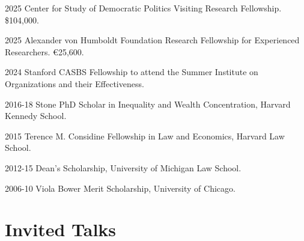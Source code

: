 \documentclass[12pt,letterpaper]{report}
\begin{document}
    \begin{tablist}
    \item[2025] \tab{}Center for Study of Democratic Politics Visiting Research Fellowship.  \$104,000.
    \item[2025] \tab{}Alexander von Humboldt Foundation Research Fellowship for Experienced Researchers. €25,600.
        \item[2024] \tab{}Stanford CASBS Fellowship to attend the Summer Institute on Organizations and their Effectiveness.
    \item[2016-18] \tab{}Stone PhD Scholar in Inequality and Wealth Concentration, Harvard Kennedy School.
    \item[2015] \tab{}Terence M. Considine Fellowship in Law and Economics, Harvard Law School.
    \item[2012-15] \tab{}Dean's Scholarship, University of Michigan Law School.
    \item[2006-10] \tab{}Viola Bower Merit Scholarship, University of Chicago.
    \end{tablist}

	

    \section*{Invited Talks}
\end{document}
